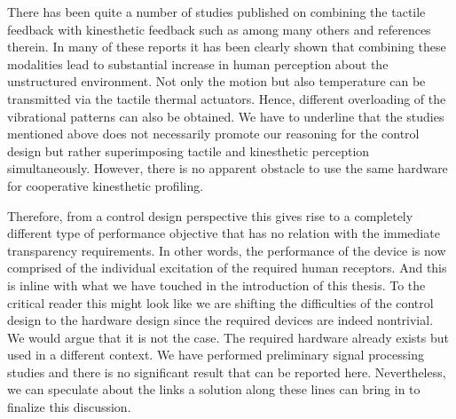 There has been quite a number of studies published on combining the tactile feedback with kinesthetic feedback such as \cite{kammermeier,
kimcolgate,kyung,pacchierotti,meli} among many others and references therein. In many of these reports it has been clearly shown that 
combining these modalities lead to substantial increase in human perception about the unstructured environment. Not only the motion but 
also temperature can be transmitted via the tactile thermal actuators. Hence, different overloading of the vibrational patterns can also 
be obtained. We have to underline that the studies mentioned above does not necessarily promote our reasoning for the control design but 
rather superimposing tactile and kinesthetic perception simultaneously. However, there is no apparent obstacle to use the same hardware 
for cooperative kinesthetic profiling. 



Therefore, from a control design perspective this gives rise to a completely different type of performance objective that has no relation 
with the immediate transparency requirements. In other words, the performance of the device is now comprised of the individual excitation 
of the required human receptors. And this is inline with what we have touched in the introduction of this thesis. To the critical reader
this might look like we are shifting the difficulties of the control design to the hardware design since the required devices are indeed
nontrivial. We would argue that it is not the case. The required hardware already exists but used in a different context. We have performed 
preliminary signal processing studies and there is no significant result that can be reported here. Nevertheless, we can speculate about 
the links a solution along these lines can bring in to finalize this discussion. 


